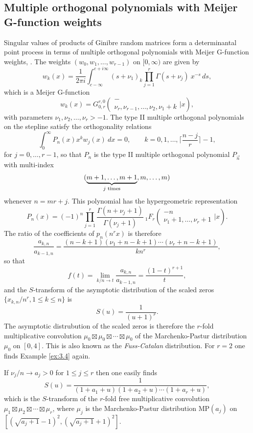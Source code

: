 \documentclass[12pt]{article}
\numberwithin{equation}{section}
\begin{document}
\subsection{Multiple orthogonal polynomials with Meijer G-function weights}
Singular values of products of Ginibre random matrices form a determinantal point process in terms of multiple orthogonal polynomials
with Meijer G-function weights, \cite{kuijlaars-zhang}. The weights $(w_0,w_1,\ldots,w_{r-1})$ on $[0,\infty)$ are given by
\[  w_k(x) = \frac{1}{2\pi i} \int_{c-\infty}^{c+i\infty} (s+\nu_1)_k \prod_{j=1}^r \Gamma(s+\nu_j) \ x^{-s}\, ds,  \]
which is a Meijer G-function
\[   w_k(x) = G_{0,r}^{r,0} \left( \begin{array}{c}  - \\ \nu_r, \nu_{r-1}, \ldots , \nu_2 , \nu_1+k  \end{array} \Bigr| x \right), \]
with parameters $\nu_1,\nu_2,\ldots,\nu_r  > -1$. The type II multiple orthogonal polynomials on the stepline satisfy the orthogonality relations
\[  \int_0^\infty P_n(x) x^k w_j(x)\ dx = 0, \qquad k=0,1,\ldots,\lceil \frac{n-j}{r} \rceil -1, \]
for $j=0,\ldots,r-1$, so that $P_n$ is the type II multiple orthogonal polynomial $P_{\vec{n}}$ with multi-index 
\[  (\underbrace{m+1,\ldots,m+1}_{j \textup{ times}},m,\ldots,m)   \]
whenever $n=mr + j$. This polynomial has the hypergeometric representation \cite[p. 768]{kuijlaars-zhang}
\[    P_n(x) = (-1)^n \prod_{j=1}^r \frac{\Gamma (n+\nu_j+1)}{\Gamma(\nu_j+1)} \  {}_1F_r \left( \begin{array}{c} -n \\ \nu_1+1,\ldots,\nu_r+1 \end{array} \Bigr| x \right). \]
The ratio of the coefficients of $p_n(n^rx)$ is therefore
\[   \frac{a_{k,n}}{a_{k-1,n}} = \frac{(n-k+1)(\nu_1+n-k+1)\cdots(\nu_r+n-k+1)}{kn^r},  \]
so that
\[   f(t) = \lim_{k/n \to t}        \frac{a_{k,n}}{a_{k-1,n}} = \frac{(1-t)^{r+1}}{t},  \]
and the $S$-transform of the asymptotic distribution of the scaled zeros $\{x_{k,n}/n^r, 1 \leq k \leq n \}$ is
\[    S(u) = \frac{1}{(u+1)^r}.   \]
The asymptotic distrubution of the scaled zeros is therefore the $r$-fold multiplicative convolution $\mu_0 \boxtimes \mu_0 \boxtimes \cdots \boxtimes \mu_0$
 of the Marchenko-Pastur distribution $\mu_0$ on $[0,4]$. This is also known as the \textit{Fuss-Catalan} distribution.
For $r=2$ one finds Example \ref{ex:3.4} again.  

If $\nu_j/n \to a_j >0$ for $1 \leq j \leq  r$ then one easily finds
\[    S(u) = \frac{1}{(1+a_1+u)(1+a_2+u)\cdots(1+a_{r}+u)}, \]
which is the $S$-transform of the $r$-fold free multiplicative convolution $\mu_1\boxtimes \mu_2 \boxtimes \cdots \boxtimes \mu_{r}$,
where $\mu_j$ is the Marchenko-Pastur distribution MP$(a_j)$ on $[(\sqrt{a_j+1}-1)^2,(\sqrt{a_j+1}+1)^2]$.
\end{document}
